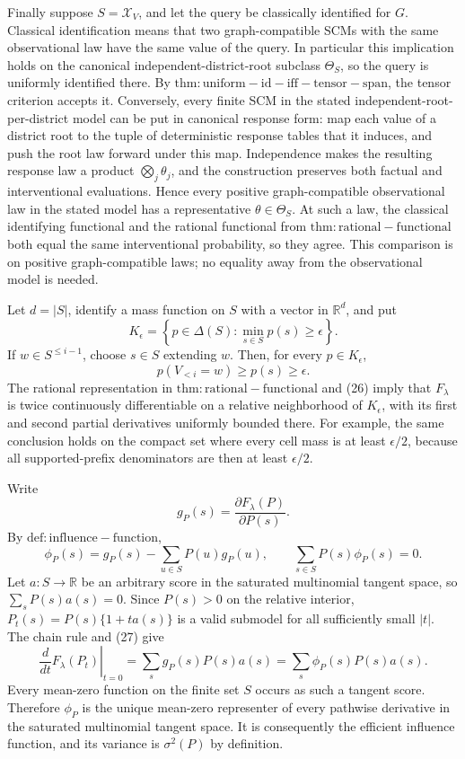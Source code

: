 Finally suppose \(S=\mathcal X_V\), and let the query be classically identified for \(G\).  Classical identification means that two graph-compatible SCMs with the same observational law have the same value of the query.  In particular this implication holds on the canonical independent-district-root subclass \(\Theta_S\), so the query is uniformly identified there.  By \(\mathrm{thm:uniform-id-iff-tensor-span}\), the tensor criterion accepts it.  Conversely, every finite SCM in the stated independent-root-per-district model can be put in canonical response form: map each value of a district root to the tuple of deterministic response tables that it induces, and push the root law forward under this map.  Independence makes the resulting response law a product \(\bigotimes_j\theta_j\), and the construction preserves both factual and interventional evaluations.  Hence every positive graph-compatible observational law in the stated model has a representative \(\theta\in\Theta_S\).  At such a law, the classical identifying functional and the rational functional from \(\mathrm{thm:rational-functional}\) both equal the same interventional probability, so they agree.  This comparison is on positive graph-compatible laws; no equality away from the observational model is needed.

Let \(d=|S|\), identify a mass function on \(S\) with a vector in \(\mathbb R^d\), and put
\[
K_\epsilon=\left\{p\in\Delta(S):\min_{s\in S}p(s)\ge\epsilon\right\}.
\]
If \(w\in S^{\le i-1}\), choose \(s\in S\) extending \(w\).  Then, for every \(p\in K_\epsilon\),
\[
p(V_{<i}=w)\ge p(s)\ge\epsilon.                              \tag{26}
\]
The rational representation in \(\mathrm{thm:rational-functional}\) and (26) imply that \(F_\lambda\) is twice continuously differentiable on a relative neighborhood of \(K_\epsilon\), with its first and second partial derivatives uniformly bounded there.  For example, the same conclusion holds on the compact set where every cell mass is at least \(\epsilon/2\), because all supported-prefix denominators are then at least \(\epsilon/2\).

Write
\[
g_P(s)=\frac{\partial F_\lambda(P)}{\partial P(s)}.
\]
By \(\mathrm{def:influence-function}\),
\[
\phi_P(s)=g_P(s)-\sum_{u\in S}P(u)g_P(u),
\qquad
\sum_{s\in S}P(s)\phi_P(s)=0.                               \tag{27}
\]
Let \(a:S\to\mathbb R\) be an arbitrary score in the saturated multinomial tangent space, so \(\sum_sP(s)a(s)=0\).  Since \(P(s)>0\) on the relative interior, \(P_t(s)=P(s)\{1+t a(s)\}\) is a valid submodel for all sufficiently small \(|t|\).  The chain rule and (27) give
\[
\left.\frac{d}{dt}F_\lambda(P_t)\right|_{t=0}
=\sum_sg_P(s)P(s)a(s)
=\sum_s\phi_P(s)P(s)a(s).                                    \tag{28}
\]
Every mean-zero function on the finite set \(S\) occurs as such a tangent score.  Therefore \(\phi_P\) is the unique mean-zero representer of every pathwise derivative in the saturated multinomial tangent space.  It is consequently the efficient influence function, and its variance is \(\sigma^2(P)\) by definition.

